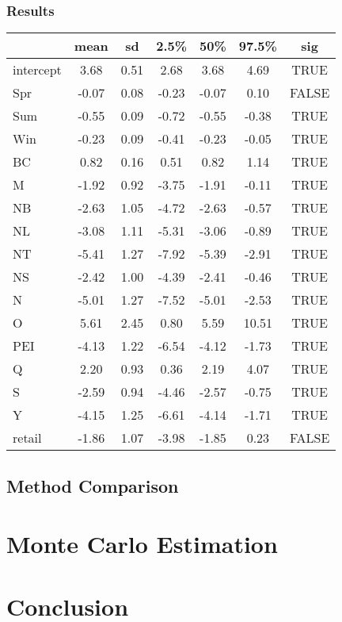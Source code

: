 \documentclass[12pt]{article}
\begin{document}
\subsubsection*{Results}
\begin{table}[hbt!]
    \centering
    \begin{tabular}{|l|c|c|c|c|c|c|}
      \hline
     & mean & sd & 2.5\% & 50\% & 97.5\% & sig \\ 
      \hline
    intercept & 3.68 & 0.51 & 2.68 & 3.68 & 4.69 & TRUE \\ 
      Spr & -0.07 & 0.08 & -0.23 & -0.07 & 0.10 & FALSE \\ 
      Sum & -0.55 & 0.09 & -0.72 & -0.55 & -0.38 & TRUE \\ 
      Win & -0.23 & 0.09 & -0.41 & -0.23 & -0.05 & TRUE \\ 
      BC & 0.82 & 0.16 & 0.51 & 0.82 & 1.14 & TRUE \\ 
      M & -1.92 & 0.92 & -3.75 & -1.91 & -0.11 & TRUE \\ 
      NB & -2.63 & 1.05 & -4.72 & -2.63 & -0.57 & TRUE \\ 
      NL & -3.08 & 1.11 & -5.31 & -3.06 & -0.89 & TRUE \\ 
      NT & -5.41 & 1.27 & -7.92 & -5.39 & -2.91 & TRUE \\ 
      NS & -2.42 & 1.00 & -4.39 & -2.41 & -0.46 & TRUE \\ 
      N & -5.01 & 1.27 & -7.52 & -5.01 & -2.53 & TRUE \\ 
      O & 5.61 & 2.45 & 0.80 & 5.59 & 10.51 & TRUE \\ 
      PEI & -4.13 & 1.22 & -6.54 & -4.12 & -1.73 & TRUE \\ 
      Q & 2.20 & 0.93 & 0.36 & 2.19 & 4.07 & TRUE \\ 
      S & -2.59 & 0.94 & -4.46 & -2.57 & -0.75 & TRUE \\ 
      Y & -4.15 & 1.25 & -6.61 & -4.14 & -1.71 & TRUE \\ 
      retail & -1.86 & 1.07 & -3.98 & -1.85 & 0.23 & FALSE \\ 
       \hline
    \end{tabular}
\end{table}
    
\subsection{Method Comparison}


\newpage
\section{Monte Carlo Estimation}

\newpage
\section{Conclusion}


 
\end{document}
